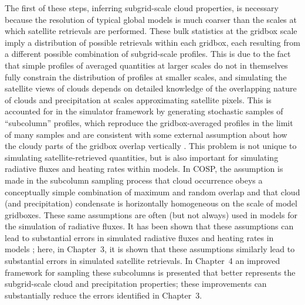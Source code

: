 The first of these steps, inferring subgrid-scale cloud properties, is
necessary because the resolution of typical global models is much
coarser than the scales at which satellite retrievals are performed.
These bulk statistics at the gridbox scale imply a distribution of
possible retrievals within each gridbox, each resulting from a different
possible combination of subgrid-scale profiles. This is due to the fact
that simple profiles of averaged quantities at larger scales do not in
themselves fully constrain the distribution of profiles at smaller
scales, and simulating the satellite views of clouds depends on detailed
knowledge of the overlapping nature of clouds and precipitation at
scales approximating satellite pixels. This is accounted for in the
simulator framework by generating stochastic samples of ``subcolumn''
profiles, which reproduce the gridbox-averaged profiles in the limit of
many samples and are consistent with some external assumption about how
the cloudy parts of the gridbox overlap vertically
\citep{klein_and_jakob_1999}. This problem is not unique to simulating
satellite-retrieved quantities, but is also important for simulating
radiative fluxes and heating rates within models. In COSP, the
assumption is made in the subcolumn sampling process that cloud
occurrence obeys a conceptually simple combination of maximum and random
overlap and that cloud (and precipitation) condensate is horizontally
homogeneous on the scale of model gridboxes. These same assumptions are
often (but not always) used in models for the simulation of radiative
fluxes. It has been shown that these assumptions can lead to substantial
errors in simulated radiative fluxes and heating rates in models
\citep{barker_et_al_1999, oreopoulos_et_al_2012}; here, in Chapter~3, it
is shown that these assumptions similarly lead to substantial errors in
simulated satellite retrievals. In Chapter~4 an improved framework for
sampling these subcolumns is presented that better represents the
subgrid-scale cloud and precipitation properties; these improvements can
substantially reduce the errors identified in Chapter~3.

